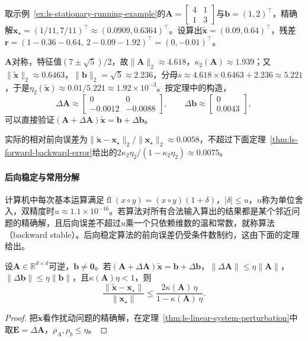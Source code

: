 \begin{example}[计算一次后向误差]
\label{ex:ls-backward-error-computation}
取示例~\ref{ex:ls-stationary-running-example}的$\bm A=\left[\begin{smallmatrix}4&1\\1&3\end{smallmatrix}\right]$与$\bm b=(1,2)^\top$，精确解$\bm x_\star=(1/11,7/11)^\top\approx(0.0909,0.6364)^\top$。设算出$\tilde{\bm x}=(0.09,0.64)^\top$，残差$\bm r=(1-0.36-0.64,\ 2-0.09-1.92)^\top=(0,-0.01)^\top$。

$\bm A$对称，特征值$(7\pm\sqrt5)/2$，故$\lVert\bm A\rVert_2\approx4.618$，$\kappa_2(\bm A)\approx1.939$；又$\lVert\tilde{\bm x}\rVert_2\approx0.6463$，$\lVert\bm b\rVert_2=\sqrt5\approx2.236$，分母$s\approx4.618\times0.6463+2.236\approx5.221$，于是$\eta_2(\tilde{\bm x})\approx0.01/5.221\approx1.92\times10^{-3}$。按定理中的构造，
\[
 \Delta\bm A\approx\begin{bmatrix}0&0\\-0.0012&-0.0088\end{bmatrix},\qquad\Delta\bm b\approx\begin{bmatrix}0\\0.0043\end{bmatrix},
\]
可以直接验证$(\bm A+\Delta\bm A)\tilde{\bm x}=\bm b+\Delta\bm b$。

实际的相对前向误差为$\lVert\tilde{\bm x}-\bm x_\star\rVert_2/\lVert\bm x_\star\rVert_2\approx0.0058$，不超过下面定理~\ref{thm:ls-forward-backward-error}给出的$2\kappa_2\eta_2/(1-\kappa_2\eta_2)\approx0.0075$。
\end{example}

\paragraph{后向稳定与常用分解}
计算机中每次基本运算满足$\operatorname{fl}(x\circ y)=(x\circ y)(1+\delta)$，$|\delta|\leq u$，$u$称为单位舍入，双精度时$u\approx1.1\times10^{-16}$。若算法对所有合法输入算出的结果都是某个邻近问题的精确解，且后向误差不超过$u$乘一个只依赖维数的温和常数，就称算法（backward stable）。后向稳定算法的前向误差仍受条件数制约，这由下面的定理给出。

\begin{theorem}[由后向误差估计前向误差]
\label{thm:ls-forward-backward-error}
设$\bm A\in\mathbb R^{d\times d}$可逆，$\bm b\ne\bm0$。若$(\bm A+\Delta\bm A)\tilde{\bm x}=\bm b+\Delta\bm b$，$\lVert\Delta\bm A\rVert\leq\eta\lVert\bm A\rVert$，$\lVert\Delta\bm b\rVert\leq\eta\lVert\bm b\rVert$，且$\kappa(\bm A)\eta<1$，则
\[
 \frac{\lVert\tilde{\bm x}-\bm x_\star\rVert}{\lVert\bm x_\star\rVert}\leq\frac{2\kappa(\bm A)\,\eta}{1-\kappa(\bm A)\,\eta}.
\]
\end{theorem}
\begin{proof}
把$\tilde{\bm x}$看作扰动问题的精确解，在定理~\ref{thm:ls-linear-system-perturbation}中取$\bm E=\Delta\bm A$，$\rho_A,\rho_b\leq\eta$。
\end{proof}

